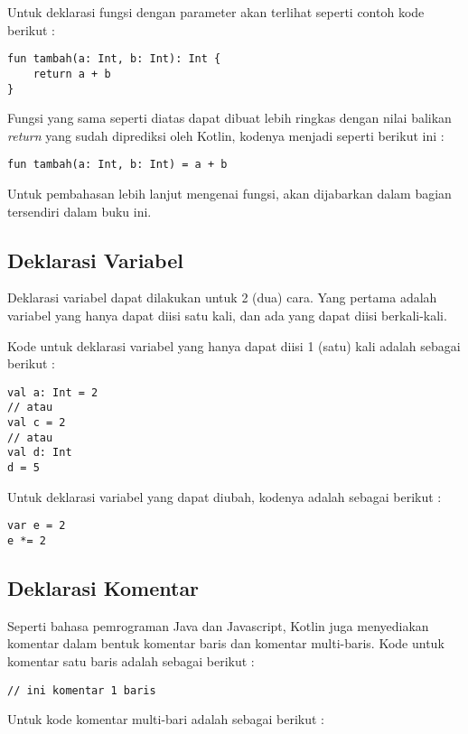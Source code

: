 Untuk deklarasi fungsi dengan parameter akan terlihat seperti contoh kode berikut :

\begin{lstlisting}
fun tambah(a: Int, b: Int): Int {
	return a + b
}
\end{lstlisting}

Fungsi yang sama seperti diatas dapat dibuat lebih ringkas dengan nilai balikan \textit{return} yang sudah diprediksi oleh Kotlin, kodenya menjadi seperti berikut ini :

\begin{lstlisting}
fun tambah(a: Int, b: Int) = a + b
\end{lstlisting}

Untuk pembahasan lebih lanjut mengenai fungsi, akan dijabarkan dalam bagian tersendiri dalam buku ini.

\subsection{Deklarasi Variabel}

Deklarasi variabel dapat dilakukan untuk 2 (dua) cara. Yang pertama adalah variabel yang hanya dapat diisi satu kali, dan ada yang dapat diisi berkali-kali. 

Kode untuk deklarasi variabel yang hanya dapat diisi 1 (satu) kali adalah sebagai berikut :

\begin{lstlisting}
val a: Int = 2 
// atau 
val c = 2
// atau
val d: Int
d = 5
\end{lstlisting}

Untuk deklarasi variabel yang dapat diubah, kodenya adalah sebagai berikut :

\begin{lstlisting}
var e = 2
e *= 2
\end{lstlisting}

\subsection{Deklarasi Komentar}

Seperti bahasa pemrograman Java dan Javascript, Kotlin juga menyediakan komentar dalam bentuk komentar baris dan komentar multi-baris. Kode untuk komentar satu baris adalah sebagai berikut :

\begin{lstlisting}
// ini komentar 1 baris
\end{lstlisting}

Untuk kode komentar multi-bari adalah sebagai berikut :


